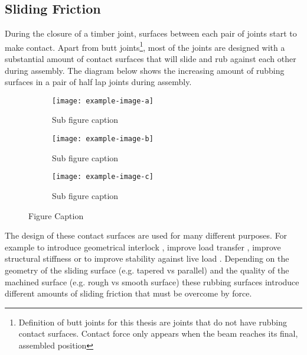\subsection{Sliding Friction}

During the closure of a timber joint, surfaces between each pair of joints start to make contact. Apart from butt joints\footnote{ Definition of butt joints for this thesis are joints that do not have rubbing contact surfaces. Contact force only appears when the beam reaches its final, assembled position}, most of the joints are designed with a substantial amount of contact surfaces that will slide and rub against each other during assembly. The diagram below shows the increasing amount of rubbing surfaces in a pair of half lap joints during assembly. 

\begin{figure}
     \centering
     \begin{subfigure}[b]{0.32\textwidth}
         \centering
         \texttt{[image: example-image-a]}
         \caption{Sub figure caption}
     \end{subfigure}
     \hfill
     \begin{subfigure}[b]{0.32\textwidth}
         \centering
         \texttt{[image: example-image-b]}
         \caption{Sub figure caption}
     \end{subfigure}
     \hfill
     \begin{subfigure}[b]{0.32\textwidth}
         \centering
         \texttt{[image: example-image-c]}
         \caption{Sub figure caption}
     \end{subfigure}
        \caption{Figure Caption}
\end{figure}


The design of these contact surfaces are used for many different purposes. For example to introduce geometrical interlock \parencite{larssonTsugiteInteractiveDesign2020, songRecursiveInterlockingPuzzles2012}, improve load transfer \parencite{likosEffectTenonGeometry2012}, improve structural stiffness \parencite{fangJoineryConnectionsTimber2018} or to improve stability against live load \parencite{jacksobonHistoricAmericanTimber2014}. Depending on the geometry of the sliding surface (e.g. tapered vs parallel) and the quality of the machined surface (e.g. rough vs smooth surface) these rubbing surfaces introduce different amounts of sliding friction that must be overcome by force.

